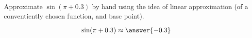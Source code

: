 \documentclass{ximera}
\author{Steven Gubkin}
\begin{document}
\begin{exercise}
Approximate $\sin(\pi+0.3)$ by hand using the idea of linear
approximation (of a conventiently chosen function, and base point).

\begin{prompt}
	$$\sin(\pi+0.3) \approx \answer{-0.3}$$
\end{prompt}

\end{exercise}
\end{document}
